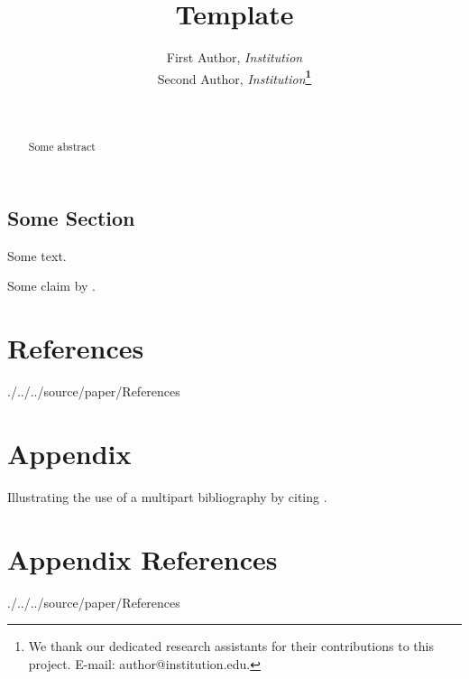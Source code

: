 \documentclass[12pt]{article}
\newcommand*{\dir}{.}
\renewcommand*{\dir}{./../..}
\begin{document}
\title{Template}
\author{First Author, \emph{Institution}\\
Second Author, \emph{Institution}\textbf{\thanks{We thank our dedicated research assistants for their contributions
to this project. E-mail: author@institution.edu.}}}
\date{\monthname\ \number\year}
\maketitle
\begin{abstract}
\noindent Some abstract
\end{abstract}
\begin{btUnit}

\begin{spacing}{1.32}

\section{Some Section}

Some text.

Some claim by \citet{gentzkow2010drives}.

\end{spacing}

\newpage{}



\newpage{}



\section*{References}

\begin{btSect}[chicago]{\dir/source/paper/References}
\btPrintCited
\end{btSect}

\end{btUnit}

\appendix

\section*{Appendix}

\begin{btUnit}

Illustrating the use of a multipart bibliography by citing \citet{gentzkow2011ideological}.

\section*{Appendix References}

\begin{btSect}[chicago]{\dir/source/paper/References}
\btPrintCited
\end{btSect}

\end{btUnit}
\end{document}

